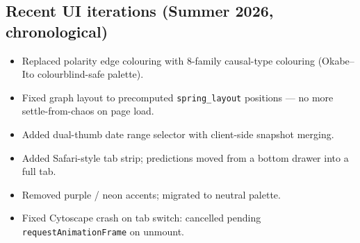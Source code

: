 \documentclass[11pt]{article}
\begin{document}
\subsection{Recent UI iterations (Summer 2026, chronological)}
\begin{itemize}
  \item Replaced polarity edge colouring with 8-family causal-type colouring (Okabe--Ito colourblind-safe palette).
  \item Fixed graph layout to precomputed \texttt{spring\_layout} positions --- no more settle-from-chaos on page load.
  \item Added dual-thumb date range selector with client-side snapshot merging.
  \item Added Safari-style tab strip; predictions moved from a bottom drawer into a full tab.
  \item Removed purple / neon accents; migrated to neutral palette.
  \item Fixed Cytoscape crash on tab switch: cancelled pending \texttt{requestAnimationFrame} on unmount.
\end{itemize}
\end{document}
